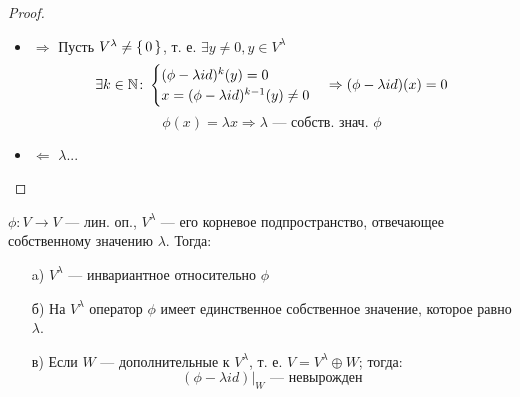 \begin{proof}
  \begin{itemize}
    \item $\Rightarrow$
  Пусть $V^{\lambda} \neq \set{0}$, т. е. $\exists y \neq 0, y \in V^{\lambda}$
  \[
  \exists k \in \mathbb{N}\colon \begin{cases}
    (\phi - \lambda id)^{k} (y) = 0 \\
    x = (\phi - \lambda id)^{k - 1}(y) \neq 0
  \end{cases} \Rightarrow (\phi - \lambda id)(x) = 0
  \]
  \[
  \phi(x) = \lambda x \Rightarrow \lambda \text{ --- собств. знач. $\phi$}
  \]
\item $\Leftarrow$ $\lambda...$
  \end{itemize}
\end{proof}
\begin{theorem}
\label{theorem:05_2}
$\phi \colon V \rightarrow V$ --- лин. оп., $V^{\lambda}$ --- его корневое подпространство, отвечающее собственному значению $\lambda$. Тогда:
\begin{itemize}
  \item [a) ] $V^{\lambda}$ --- инвариантное относительно $\phi$
  \item [б) ] На $V^{\lambda}$ оператор $\phi$ имеет единственное собственное значение, которое равно $\lambda$.
  \item [в) ] Если $W$ --- дополнительные к $V^{\lambda}$, т. е.  $V = V^{\lambda} \oplus W$; тогда:
    \[
      (\phi - \lambda id)|_{W} \text{ --- невырожден}
    \]
\end{itemize}
\end{theorem}
